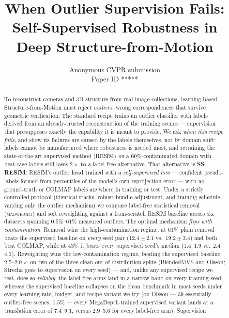 \documentclass[10pt,twocolumn,letterpaper]{article}
\title{When Outlier Supervision Fails:\\
Self-Supervised Robustness in Deep Structure-from-Motion}
\author{Anonymous CVPR submission\\ Paper ID *****}
\newcommand{\mad}{\textsc{madweight}}
\begin{document}
\maketitle
\begin{abstract}
To reconstruct cameras and 3D structure from real image collections, learning-based
Structure-from-Motion must reject \emph{outliers}: wrong correspondences that survive
geometric verification. The standard recipe trains an outlier classifier with labels
derived from an already-trusted reconstruction of the training scenes --- supervision
that presupposes exactly the capability it is meant to provide. We ask \emph{when this
recipe fails}, and show its failures are caused by the labels themselves, not by domain
shift: labels cannot be manufactured where robustness is needed most, and retraining the
state-of-the-art supervised method (RESfM) \emph{on} a $60\%$-contaminated domain with
best-case labels still loses $2\times$ to a label-free alternative. That alternative is
\textbf{SS-RESfM}: RESfM's outlier head trained with a \emph{self-supervised loss} ---
confident pseudo-labels formed from percentiles of the model's own reprojection error ---
with no ground-truth or COLMAP labels anywhere in training or test. Under a strictly controlled protocol (identical tracks, robust bundle adjustment,
and training schedule, varying only the outlier mechanism) we compare label-free
statistical removal (\mad{}) and soft reweighting against a from-scratch RESfM baseline
across six datasets spanning $0.5\%$--$61\%$ measured outliers. The optimal mechanism
\emph{flips with contamination}. Removal wins the high-contamination regime: at $61\%$
plain removal beats the supervised baseline on \emph{every} seed pair
($12.4\pm2.1$ vs.\ $19.2\pm3.4$) and both beat COLMAP, while at $43\%$ it beats every
supervised seed's median ($1.4$--$1.9$ vs.\ $2.4$--$4.3$). Reweighting wins the low-contamination regime, beating
the supervised baseline $2.5$--$2.9\times$ on two of the three clean out-of-distribution
splits (BlendedMVS and Olsson; Strecha goes to supervision on every seed) --- and,
unlike any supervised recipe we test, does so \emph{reliably}: the label-free arms land
in a narrow band on every training seed, whereas the supervised baseline collapses on
the clean benchmark in most seeds under every learning rate, budget, and recipe variant
we try (on Olsson --- $39$ essentially outlier-free scenes, $0.5\%$ --- every
MegaDepth-trained supervised variant lands at a translation error of $7.4$--$9.1$,
versus $2.9$--$3.6$ for every label-free arm). Supervision

\end{abstract}
\end{document}
